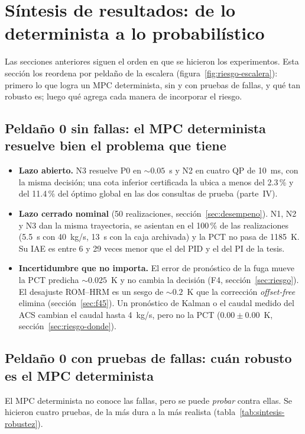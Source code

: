 \section{Síntesis de resultados: de lo determinista a lo probabilístico}\label{sec:riesgo-sintesis}
Las secciones anteriores siguen el orden en que se hicieron los experimentos. Esta sección los
reordena por peldaño de la escalera (figura~\ref{fig:riesgo-escalera}): primero lo que logra un
MPC determinista, sin y con pruebas de fallas, y qué tan robusto es; luego qué agrega cada manera
de incorporar el riesgo.

\subsection{Peldaño 0 sin fallas: el MPC determinista resuelve bien el problema que tiene}
\begin{itemize}
  \item \textbf{Lazo abierto.} N3 resuelve P0 en $\sim0.05$~s y N2 en cuatro QP de 10~ms, con la
        misma decisión; una cota inferior certificada la ubica a menos del 2.3\,\% y del 11.4\,\%
        del óptimo global en las dos consultas de prueba (parte~IV).
  \item \textbf{Lazo cerrado nominal} (50 realizaciones, sección~\ref{sec:desempeno}). N1, N2 y N3
        dan la misma trayectoria, se asientan en el 100\,\% de las realizaciones (5.5~s con
        40~kg/s, 13~s con la caja archivada) y la PCT no pasa de 1185~K. Su IAE es entre 6 y 29
        veces menor que el del PID y el del PI de la tesis.
  \item \textbf{Incertidumbre que no importa.} El error de pronóstico de la fuga mueve la PCT
        predicha $\sim0.025$~K y no cambia la decisión (F4, sección~\ref{sec:riesgo}). El desajuste
        ROM--HRM es un sesgo de $\sim0.2$~K que la corrección \emph{offset-free} elimina
        (sección~\ref{sec:f45}). Un pronóstico de Kalman o el caudal medido del ACS cambian el caudal
        hasta 4~kg/s, pero no la PCT ($0.00\pm0.00$~K, sección~\ref{sec:riesgo-donde}).
\end{itemize}

\subsection{Peldaño 0 con pruebas de fallas: cuán robusto es el MPC determinista}
El MPC determinista no conoce las fallas, pero se puede \emph{probar} contra ellas. Se hicieron
cuatro pruebas, de la más dura a la más realista (tabla~\ref{tab:sintesis-robustez}).

